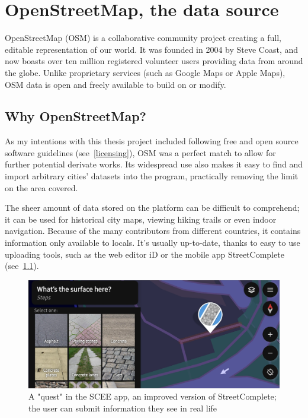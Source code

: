 \chapter{OpenStreetMap, the data source}

OpenStreetMap (OSM) is a collaborative community project creating a full, editable representation of our world. It was founded in 2004 by Steve Coast, and now boasts over ten million registered volunteer users providing data from around the globe. Unlike proprietary services (such as Google Maps or Apple Maps), OSM data is open and freely available to build on or modify.\cite{osmHistory}

\section{Why OpenStreetMap?}

As my intentions with this thesis project included following free and open source software guidelines (see~\ref{licensing}), OSM was a perfect match to allow for further potential derivate works. Its widespread use also makes it easy to find and import arbitrary cities' datasets into the program, practically removing the limit on the area covered.

The sheer amount of data stored on the platform can be difficult to comprehend; it can be used for historical city maps, viewing hiking trails or even indoor navigation. Because of the many contributors from different countries, it contains information only available to locals. It's usually up-to-date, thanks to easy to use uploading tools, such as the web editor iD or the mobile app StreetComplete (see~\ref{scee}).

\begin{figure}[h]
    \centering
    \includegraphics[width=140mm, keepaspectratio]{images/scee_example.jpg}
    \caption{A "quest" in the SCEE app, an improved version of StreetComplete; the user can submit information they see in real life \label{scee}}
\end{figure}

